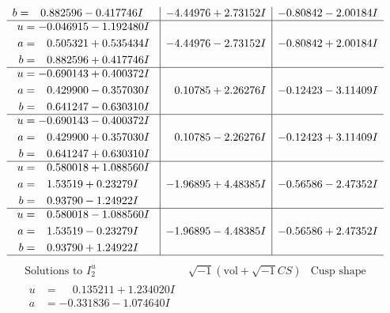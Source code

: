 \documentclass[1p]{elsarticle_modified}
\theoremstyle{definition}
\newcommand{\I}{\sqrt{-1}}
\begin{document}
$$\begin{array}{c|c|c}
\begin{aligned}
b &= \phantom{-}0.882596 - 0.417746 I\end{aligned}
 & -4.44976 + 2.73152 I & -0.80842 - 2.00184 I \\ \hline\begin{aligned}
u &= -0.046915 - 1.192480 I \\
a &= \phantom{-}0.505321 + 0.535434 I \\
b &= \phantom{-}0.882596 + 0.417746 I\end{aligned}
 & -4.44976 - 2.73152 I & -0.80842 + 2.00184 I \\ \hline\begin{aligned}
u &= -0.690143 + 0.400372 I \\
a &= \phantom{-}0.429900 - 0.357030 I \\
b &= \phantom{-}0.641247 - 0.630310 I\end{aligned}
 & \phantom{-}0.10785 + 2.26276 I & -0.12423 - 3.11409 I \\ \hline\begin{aligned}
u &= -0.690143 - 0.400372 I \\
a &= \phantom{-}0.429900 + 0.357030 I \\
b &= \phantom{-}0.641247 + 0.630310 I\end{aligned}
 & \phantom{-}0.10785 - 2.26276 I & -0.12423 + 3.11409 I \\ \hline\begin{aligned}
u &= \phantom{-}0.580018 + 1.088560 I \\
a &= \phantom{-}1.53519 + 0.23279 I \\
b &= \phantom{-}0.93790 - 1.24922 I\end{aligned}
 & -1.96895 + 4.48385 I & -0.56586 - 2.47352 I \\ \hline\begin{aligned}
u &= \phantom{-}0.580018 - 1.088560 I \\
a &= \phantom{-}1.53519 - 0.23279 I \\
b &= \phantom{-}0.93790 + 1.24922 I\end{aligned}
 & -1.96895 - 4.48385 I & -0.56586 + 2.47352 I\\
 \hline 
 \end{array}$$\newpage$$\begin{array}{c|c|c}  
\text{Solutions to }I^u_{2}& \I (\text{vol} + \sqrt{-1}CS) & \text{Cusp shape}\\
 \hline 
\begin{aligned}
u &= \phantom{-}0.135211 + 1.234020 I \\
a &= -0.331836 - 1.074640 I \\

\end{aligned}
\end{array}$$
\end{document}
